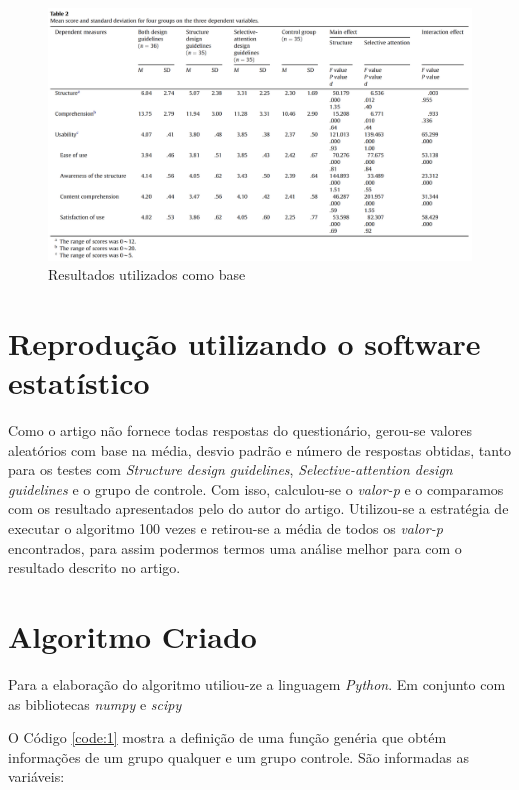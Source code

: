 \documentclass[12pt]{article}
\begin{document}
\begin{figure}[H]
  \centering
  \includegraphics[width=35em]{images/table.png}
  \caption{Resultados utilizados como base}
  \label{fig:img1}
\end{figure}

\section{Reprodução utilizando o software estatístico}

Como o artigo não fornece todas respostas do questionário, gerou-se valores aleatórios com base na média, desvio padrão e número de respostas obtidas, tanto para os testes com \textit{Structure design guidelines}, \textit{Selective-attention design guidelines} e o grupo de controle. Com isso, calculou-se o \textit{valor-p} e o comparamos com os resultado apresentados pelo do autor do artigo. Utilizou-se a estratégia de executar o algoritmo 100 vezes e retirou-se a média de todos os \textit{valor-p} encontrados, para assim podermos termos uma análise melhor para com o resultado descrito no artigo.

\section{Algoritmo Criado}

Para a elaboração do algoritmo utiliou-ze a linguagem \textit{Python}. Em conjunto com as bibliotecas \textit{numpy} e \textit{scipy}

O Código \ref{code:1} mostra a definição de uma função genéria que obtém informações de um grupo qualquer e um grupo controle. São informadas as variáveis:
\end{document}
